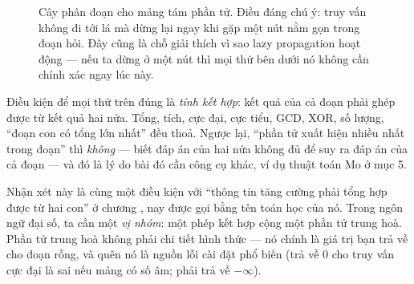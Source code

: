 \documentclass[../../algorithm.tex]{subfiles}
\begin{document}
\begin{figure}[H]\centering
{}
\caption{Cây phân đoạn cho mảng tám phần tử. Điều đáng chú ý: truy vấn không đi tới lá mà dừng lại ngay khi gặp một nút nằm gọn trong đoạn hỏi. Đây cũng là chỗ giải thích vì sao lazy propagation hoạt động --- nếu ta dừng ở một nút thì mọi thứ bên dưới nó không cần chính xác ngay lúc này.}
\label{fig:segtree}
\end{figure}

Điều kiện để mọi thứ trên đúng là \emph{tính kết hợp}: kết quả của cả đoạn phải ghép được từ kết quả hai nửa. Tổng, tích, cực đại, cực tiểu, GCD, XOR, số lượng, ``đoạn con có tổng lớn nhất'' đều thoả. Ngược lại, ``phần tử xuất hiện nhiều nhất trong đoạn'' thì \emph{không} --- biết đáp án của hai nửa không đủ để suy ra đáp án của cả đoạn --- và đó là lý do bài đó cần công cụ khác, ví dụ thuật toán Mo ở mục 5.

Nhận xét này là cùng một điều kiện với ``thông tin tăng cường phải tổng hợp được từ hai con'' ở chương , nay được gọi bằng tên toán học của nó. Trong ngôn ngữ đại số, ta cần một \emph{vị nhóm}: một phép kết hợp cộng một phần tử trung hoà. Phần tử trung hoà không phải chi tiết hình thức --- nó chính là giá trị bạn trả về cho đoạn rỗng, và quên nó là nguồn lỗi cài đặt phổ biến (trả về 0 cho truy vấn cực đại là sai nếu mảng có số âm; phải trả về \(-\infty\)).
\end{document}
